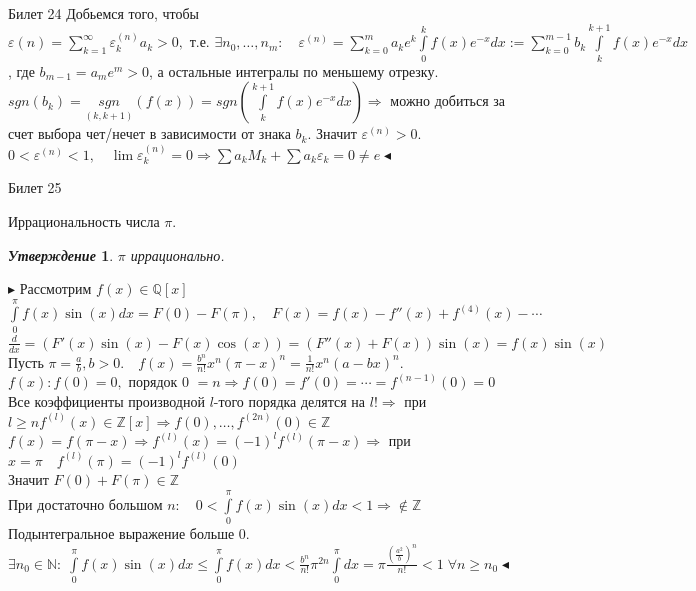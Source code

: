 \documentclass[a4paper,12pt]{article}
\newtheorem{utv}{\textit{Утверждение}}
\newcommand{\q}{\quad}
\newcommand{\pb}{\blacktriangleright}
\newcommand{\pe}{\blacktriangleleft}
\newcommand{\Ra}{\Rightarrow}
\newcommand{\bb}[1]{\mathbb{#1}}
\newcommand{\SL}{\sum\limits}
\newcommand{\IL}{\int\limits}
\newcommand{\os}{\left(}
\newcommand{\cs}{\right)}
\begin{document}
\newpage
\begin{mybox2}{{Билет 24}}
Добьемся того, чтобы $\varepsilon(n) =\SL_{k=1}^\infty \varepsilon_k^{(n)} a_k > 0,    \text{ т.е. } \exists n_0,\dots,n_m:\q \varepsilon^{(n)} = \SL_{k=0}^m a_ke^k\IL_0^k f(x)e^{-x}dx:=\SL_{k=0}^{m-1}b_k\IL_k^{k+1}f(x)e^{-x}dx $, где $b_{m-1} = a_me^m>0$, а остальные интегралы по меньшему отрезку.\\
$sgn(b_k) = \underset{(k,k+1)}{sgn}(f(x)) = sgn(\IL_k^{k+1}f(x)e^{-x}dx) \Ra$ можно добиться за счет выбора чет/нечет в зависимости от знака $b_k$. Значит $\varepsilon^{(n)} > 0$.\\
$0 < \varepsilon^{(n)}<1, \q \lim \varepsilon_k^{(n)} = 0\Ra \sum a_kM_k + \sum a_k \varepsilon_k = 0 \not=e \pe $



\end{mybox2}


\newpage
\begin{mybox}{\hypertarget{bil25}{Билет 25}}

\begin{formbox}{}
Иррациональность числа $\pi$.
\end{formbox}
\begin{formbox}{}
\begin{utv} $\pi$ иррационально.
\end{utv}
\end{formbox}


$\pb $ Рассмотрим \(f(x) \in\bb{Q}[x]\)\\
\(\IL_0^\pi f(x)\sin(x)dx = F(0) - F(\pi),\q F(x) = f(x) - f''(x) + f^{(4)}(x)-\cdots\)\\
\(\frac{d}{dx} = (F'(x)\sin(x) - F(x)\cos(x)) = (F''(x) + F(x))\sin(x) = f(x)\sin(x) \)\\
Пусть \(\pi = \frac{a}{b}, b > 0.\q f(x) = \frac{b^n}{n!}x^n (\pi - x)^n= \frac{1}{n!}x^n(a-bx)^n.\)\\
\(f(x): f(0) = 0,\) порядок 0 \( = n\Ra f(0) = f'(0) = \cdots = f^{(n-1)}(0) = 0 \)\\
Все коэффициенты производной $l$-того порядка делятся на $l!\Ra$ при $l \ge n f^{(l)}(x)\in\bb{Z}[x]\Ra f(0), \dots, f^{(2n)}(0)\in\bb{Z}$\\
\(f(x) = f(\pi - x)\Ra f^{(l)}(x) = (-1)^l f^{(l)}(\pi-x)\Ra \) при \(x = \pi\q f^{(l)}(\pi) = (-1)^l f^{(l)}(0) \)\\
Значит $F(0) + F(\pi) \in\bb{Z}$\\
При достаточно большом \(n:\q 0 < \IL_0^\pi f(x)\sin(x)dx < 1\Ra \not\in\bb{Z}\)\\
Подынтегральное выражение больше 0.\\
\(\exists n_0\in\bb{N}:\;\IL_0^\pi f(x)\sin(x)dx \le \IL_0^\pi f(x)dx < \frac{b^n}{n!}\pi^{2n}\IL_0^\pi dx = \pi\frac{\os \frac{a^2}{b} \cs^n}{n!} < 1\; \forall n \ge n_0 \pe\)

\end{mybox}
\end{document}

